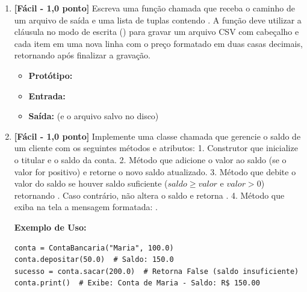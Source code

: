 \begin{enumerate}[label=\textbf{Q\arabic*.}, start=64]
\item \textbf{[Fácil - 1,0 ponto]} Escreva uma função chamada  que receba o caminho de um arquivo de saída e uma lista de tuplas contendo . A função deve utilizar a cláusula  no modo de escrita () para gravar um arquivo CSV com cabeçalho  e cada item em uma nova linha com o preço formatado em duas casas decimais, retornando  após finalizar a gravação.

\begin{itemize}[leftmargin=*]
    \item \textbf{Protótipo:}\newline {}\\
    \item \textbf{Entrada:} 
    \item \textbf{Saída:}  (e o arquivo  salvo no disco)
\end{itemize}



\vspace{0.4cm}

\item \textbf{[Fácil - 1,0 ponto]} Implemente uma classe chamada  que gerencie o saldo de um cliente com os seguintes métodos e atributos:
1. Construtor  que inicialize o titular e o saldo da conta.
2. Método  que adicione o valor ao saldo (se o valor for positivo) e retorne o novo saldo atualizado.
3. Método  que debite o valor do saldo se houver saldo suficiente ($saldo \ge valor$ e $valor > 0$) retornando . Caso contrário, não altera o saldo e retorna .
4. Método  que exiba na tela a mensagem formatada: .

\textbf{Exemplo de Uso:}
\begin{verbatim}
conta = ContaBancaria("Maria", 100.0)
conta.depositar(50.0)  # Saldo: 150.0
sucesso = conta.sacar(200.0)  # Retorna False (saldo insuficiente)
conta.print()  # Exibe: Conta de Maria - Saldo: R$ 150.00
\end{verbatim}


\end{enumerate}
